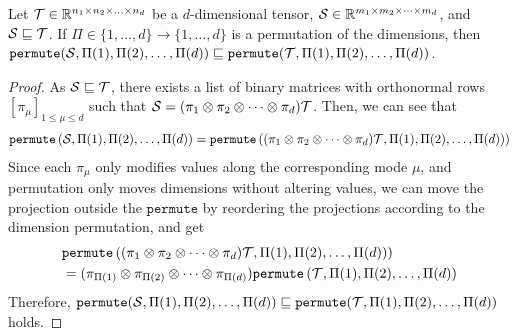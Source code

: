 \begin{lemma}\label{lemma:appendix:subtensor-permute}
Let $\mathcal{T} \in \mathbb{R}^{n_1 \times n_2 \times \ldots \times n_d}$ be a $d$-dimensional tensor, $\mathcal{S}  \in \mathbb{R}^{m_1 \times m_2 \times \cdots \times m_d}$, and $\mathcal{S} \sqsubseteq \mathcal{T}$.
%
If $\Pi \in \{1,\ldots, d\} \rightarrow \{1,\ldots, d\}$ is a permutation of the dimensions,
then $\mathtt{permute}(\mathcal{S}, \Pi(1), \Pi(2), \ldots, \Pi(d)) \sqsubseteq \mathtt{permute}(\mathcal{T}, \Pi(1), \Pi(2), \ldots, \Pi(d))$.
\end{lemma}
\begin{proof}
As $\mathcal{S} \sqsubseteq \mathcal{T}$, there exists a list of binary matrices with orthonormal rows $[\pi_\mu]_{1\leq \mu \leq d}$ such that $\mathcal{S} = (\pi_1 \otimes \pi_2 \otimes \cdots \otimes \pi_d) \mathcal{T}$.
%
Then, we can see that
\begin{align*}
    \mathtt{permute}\left(\mathcal{S}, \Pi(1), \Pi(2), \ldots, \Pi(d)\right)= \mathtt{permute}\left((\pi_{1} \otimes \pi_{2} \otimes \cdots \otimes \pi_{d})\mathcal{T}, \Pi(1), \Pi(2), \ldots, \Pi(d))\right)
\end{align*}
%
Since each $\pi_\mu$ only modifies values along the corresponding mode $\mu$, and permutation only moves dimensions without altering values, we can move the projection outside the $\mathtt{permute}$ by reordering the projections according to the dimension permutation, and get 
\begin{align*}
&\mathtt{permute}\left((\pi_{1} \otimes \pi_{2} \otimes \cdots \otimes \pi_{d})\mathcal{T}, \Pi(1), \Pi(2), \ldots, \Pi(d))\right) \\
&= (\pi_{\Pi(1)} \otimes \pi_{\Pi(2)} \otimes \cdots \otimes \pi_{\Pi(d)})\mathtt{permute}\left(\mathcal{T}, \Pi(1), \Pi(2), \ldots, \Pi(d)\right)
\end{align*}
%
Therefore, $\mathtt{permute}(\mathcal{S}, \Pi(1), \Pi(2), \ldots, \Pi(d)) \sqsubseteq \mathtt{permute}(\mathcal{T}, \Pi(1), \Pi(2), \ldots, \Pi(d))$ holds.
\end{proof}

